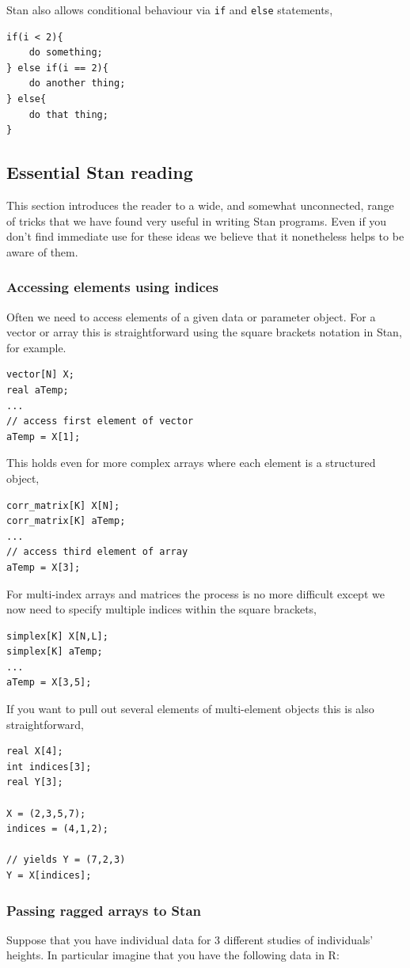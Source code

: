\documentclass[11pt,fullpage]{book}
\begin{document}
Stan also allows conditional behaviour via \texttt{if} and \texttt{else} statements,
\begin{verbatim}
if(i < 2){
    do something;
} else if(i == 2){
    do another thing;
} else{
    do that thing;
}
\end{verbatim}

\subsection{Essential Stan reading}
This section introduces the reader to a wide, and somewhat unconnected, range of tricks that we have found very useful in writing Stan programs. Even if you don't find immediate use for these ideas we believe that it nonetheless helps to be aware of them.

\subsubsection{Accessing elements using indices}
Often we need to access elements of a given data or parameter object. For a vector or array this is straightforward using the square brackets notation in Stan, for example.

\begin{verbatim}
vector[N] X;
real aTemp;
...
// access first element of vector
aTemp = X[1];
\end{verbatim}
This holds even for more complex arrays where each element is a structured object,

\begin{verbatim}
corr_matrix[K] X[N];
corr_matrix[K] aTemp;
...
// access third element of array
aTemp = X[3];
\end{verbatim}
For multi-index arrays and matrices the process is no more difficult except we now need to specify multiple indices within the square brackets,

\begin{verbatim}
simplex[K] X[N,L];
simplex[K] aTemp;
...
aTemp = X[3,5];
\end{verbatim}
If you want to pull out several elements of multi-element objects this is also straightforward,
\begin{verbatim}
real X[4];
int indices[3];
real Y[3];

X = (2,3,5,7);
indices = (4,1,2);

// yields Y = (7,2,3)
Y = X[indices];
\end{verbatim}

\subsubsection{Passing ragged arrays to Stan}\label{sec:StanJags_ragged}
Suppose that you have individual data for 3 different studies of individuals' heights. In particular imagine that you have the following data in R:
\end{document}
